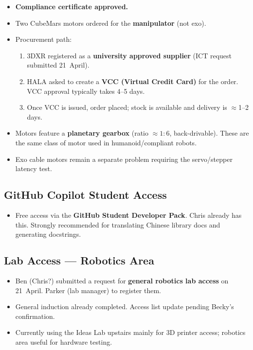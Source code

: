 \documentclass[11pt, a4paper]{article}
\begin{document}
\begin{itemize}[nosep]
  \item \textbf{Compliance certificate approved.}
  \item Two CubeMars motors ordered for the \textbf{manipulator} (not exo).
  \item Procurement path:
    \begin{enumerate}[nosep]
      \item 3DXR registered as a \textbf{university approved supplier} (ICT
        request submitted 21~April).
      \item HALA asked to create a \textbf{VCC (Virtual Credit Card)} for
        the order.  VCC approval typically takes 4--5 days.
      \item Once VCC is issued, order placed; stock is available and
        delivery is $\approx$1--2 days.
    \end{enumerate}
  \item Motors feature a \textbf{planetary gearbox} (ratio $\approx 1:6$,
    back-drivable).  These are the same class of motor used in
    humanoid/compliant robots.
  \item Exo cable motors remain a separate problem requiring the
    servo/stepper latency test.
\end{itemize}

\subsection{GitHub Copilot Student Access}

\begin{itemize}[nosep]
  \item Free access via the \textbf{GitHub Student Developer Pack}.
    Chris already has this.  Strongly recommended for translating Chinese
    library docs and generating docstrings.
\end{itemize}

\subsection{Lab Access --- Robotics Area}

\begin{itemize}[nosep]
  \item Ben (Chris?) submitted a request for \textbf{general robotics lab
    access} on 21~April.  Parker (lab manager) to register them.
  \item General induction already completed.  Access list update pending
    Becky's confirmation.
  \item Currently using the Ideas Lab upstairs mainly for 3D printer access;
    robotics area useful for hardware testing.
\end{itemize}
\end{document}
